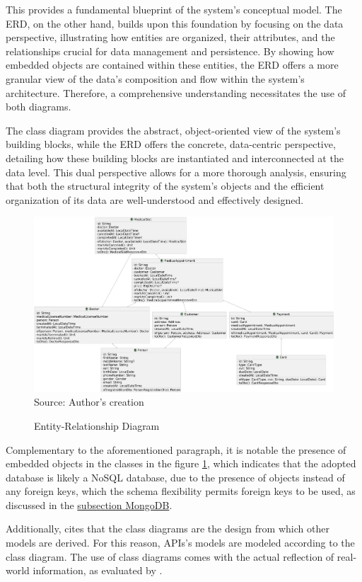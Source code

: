 This provides a fundamental blueprint of the system's conceptual model. The ERD, on the other hand, builds upon this foundation by focusing on the data perspective, illustrating how entities are organized, their attributes, and the relationships crucial for data management and persistence. By showing how embedded objects are contained within these entities, the ERD offers a more granular view of the data's composition and flow within the system's architecture. Therefore, a comprehensive understanding necessitates the use of both diagrams. 

The class diagram provides the abstract, object-oriented view of the system's building blocks, while the ERD offers the concrete, data-centric perspective, detailing how these building blocks are instantiated and interconnected at the data level. This dual perspective allows for a more thorough analysis, ensuring that both the structural integrity of the system's objects and the efficient organization of its data are well-understood and effectively designed.

\begin{figure}[H]
    \caption{Entity-Relationship Diagram}
    \centering
    \includegraphics[angle=90, width=0.6792\linewidth]{figures/erd.png}
    \label{fig:erd}
    \\ \footnotesize Source: Author's creation
\end{figure}

Complementary to the aforementioned paragraph, it is notable the presence of embedded objects in the classes in the figure \ref{fig:erd}, which indicates that the adopted database is likely a NoSQL database, due to the presence of objects instead of any foreign keys, which the schema flexibility permits foreign keys to be used, as discussed in the \hyperref[subsection:database]{subsection MongoDB}.

Additionally, \cite{nanthaamornphong2019extended} cites that the class diagrams are the design from which other models are derived. For this reason, APIs's models are modeled according to the class diagram. The use of class diagrams comes with the actual reflection of real-world information, as evaluated by \cite{vo2020transformation}. 

